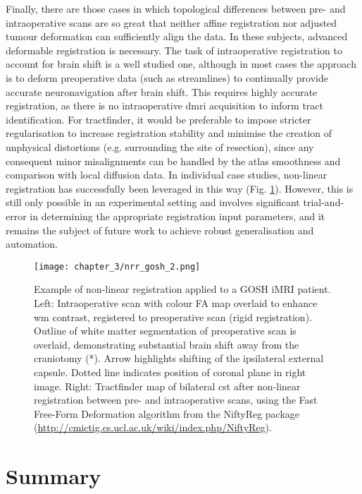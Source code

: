 Finally, there are those cases in which topological differences between pre- and intraoperative scans are so great that neither affine registration nor adjusted tumour deformation can sufficiently align the data.
In these subjects, advanced deformable registration is necessary.
The task of intraoperative registration to account for brain shift is a well studied one, although in most cases the approach is to deform preoperative data (such as streamlines) to continually provide accurate neuronavigation after brain shift.\autocite{Clatz2005,Archip2007,Wittek2007,Archip2008}
This requires highly accurate registration, as there is no intraoperative \gls{dmri} acquisition to inform tract identification.
For tractfinder, it would be preferable to impose stricter regularisation to increase registration stability and minimise the creation of unphysical distortions (e.g. surrounding the site of resection), since any consequent minor misalignments can be handled by the atlas smoothness and comparison with local diffusion data.
In individual case studies, non-linear registration has successfully been leveraged in this way (Fig. \ref{fig:nrrex}).
However, this is still only possible in an experimental setting and involves significant trial-and-error in determining the appropriate registration input parameters, and it remains the subject of future work to achieve robust generalisation and automation.

\begin{figure}[hb!]
  \centering
  \texttt{[image: chapter\_3/nrr\_gosh\_2.png]}
  \caption{Example of non-linear registration applied to a GOSH iMRI patient. Left: Intraoperative scan with colour FA map overlaid to enhance \gls{wm} contrast, registered to preoperative scan (rigid registration). Outline of white matter segmentation of preoperative scan is overlaid, demonstrating substantial brain shift away from the craniotomy (*). Arrow highlights shifting of the ipsilateral external capsule. Dotted line indicates position of coronal plane in right image. Right: Tractfinder map of bilateral \gls{cst} after non-linear registration between pre- and intraoperative scans, using the Fast Free-Form Deformation algorithm\autocite{Modat2010} from the NiftyReg package (\url{http://cmictig.cs.ucl.ac.uk/wiki/index.php/NiftyReg}).}
  \label{fig:nrrex}
\end{figure}

\section{Summary}


